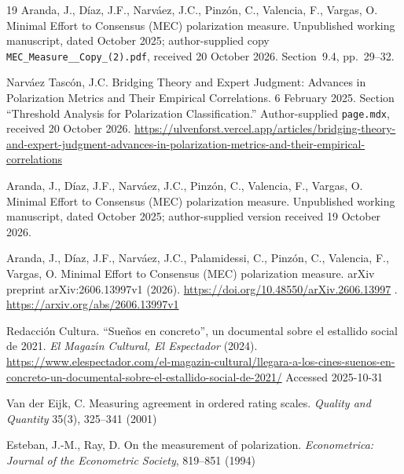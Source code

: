 \documentclass{article}
\theoremstyle{plain}
\theoremstyle{remark}
\begin{document}
\begin{thebibliography}{19}
Aranda, J., Díaz, J.F., Narváez, J.C., Pinzón, C., Valencia, F., Vargas, O.
Minimal Effort to Consensus (MEC) polarization measure.
Unpublished working manuscript, dated October 2025; author-supplied copy
\nolinkurl{MEC_Measure__Copy_(2).pdf}, received 20 October 2026.
Section~9.4, pp.~29--32.

Narváez Tascón, J.C.
Bridging Theory and Expert Judgment: Advances in Polarization Metrics and Their Empirical Correlations.
6 February 2025. Section ``Threshold Analysis for Polarization Classification.''
Author-supplied \nolinkurl{page.mdx}, received 20 October 2026.
\url{https://ulvenforst.vercel.app/articles/bridging-theory-and-expert-judgment-advances-in-polarization-metrics-and-their-empirical-correlations}

Aranda, J., Díaz, J.F., Narváez, J.C., Pinzón, C., Valencia, F., Vargas, O.
Minimal Effort to Consensus (MEC) polarization measure.
Unpublished working manuscript, dated October 2025; author-supplied version received 19 October 2026.


Aranda, J.,
D{\'i}az, J.F.,
Narv{\'a}ez, J.C.,
Palamidessi, C.,
Pinz{\'o}n, C.,
Valencia, F.,
Vargas, O.
Minimal Effort to Consensus ({MEC}) polarization measure.
arXiv preprint arXiv:2606.13997v1
(2026).
\url{https://doi.org/10.48550/arXiv.2606.13997} .
\url{https://arxiv.org/abs/2606.13997v1}


Redacción Cultura.
“Sue{\~n}os en concreto”, un documental sobre el estallido social de 2021.
\emph{El Magaz{\'\i}n Cultural, El Espectador}
(2024).
\url{https://www.elespectador.com/el-magazin-cultural/llegara-a-los-cines-suenos-en-concreto-un-documental-sobre-el-estallido-social-de-2021/}
Accessed 2025-10-31


Van der Eijk, C.
Measuring agreement in ordered rating scales.
\emph{Quality and Quantity}
35(3),
325--341
(2001)


Esteban, J.-M.,
Ray, D.
On the measurement of polarization.
\emph{Econometrica: Journal of the Econometric Society},
819--851
(1994)


\end{thebibliography}
\end{document}
